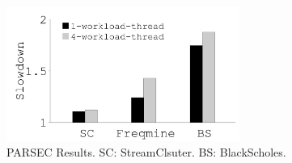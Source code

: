 {
\begin{figure}[th]
\begin{minipage}{3in}
\begin{center}
\centerline{\includegraphics[width=3in]{lego/Figures/g_plot_LEGO_parsec.pdf}}
\caption[PARSEC Results.]{PARSEC Results. SC: StreamClsuter. BS: BlackScholes.}
\label{fig-parsec}
\end{center}
\end{minipage}
\end{figure}
}